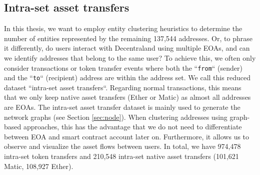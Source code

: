 \documentclass[12pt,a4paper,titlepage,oneside,english]{article}
\begin{document}
\subsection{Intra-set asset transfers}
\label{sec:intra-set}
In this thesis, we want to employ entity clustering heuristics to determine the number of entities represented by the remaining 137,544 addresses. Or, to phrase it differently, do users interact with Decentraland using multiple EOAs, and can we identify addresses that belong to the same user?
\newline
To achieve this, we often only %
consider transactions or token transfer events where both the ``\texttt{from}`` (sender) and the ``\texttt{to}`` (recipient) address are within the address set. We call this reduced dataset ``intra-set asset transfers``. Regarding normal transactions, this means that we only keep native asset transfers (Ether or Matic) as almost all addresses are EOAs. \newline
The intra-set asset transfer dataset is mainly used to generate the network graphs (see Section \ref{sec:node}). %
When clustering addresses using graph-based approaches, this has the advantage that we do not need to differentiate between EOA and smart contract account later on. Furthermore, it allows us to observe and visualize the asset flows between users. In total, we have 974,478 intra-set token transfers and 210,548 intra-set native asset transfers (101,621 Matic, 108,927 Ether).
\end{document}
